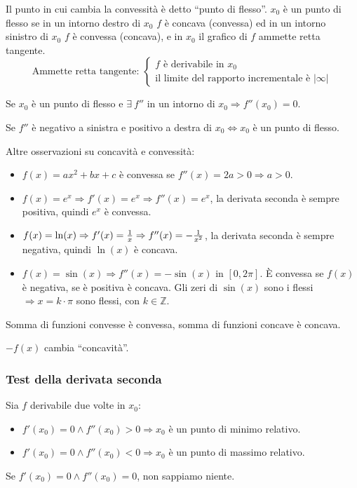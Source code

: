 \documentclass[12pt,a4paper]{article}
\begin{document}
Il punto in cui cambia la convessit\`a \`e detto ``punto di flesso''.
$x_0$ \`e un punto di flesso se in un intorno destro di $x_0$ $f$ \`e
concava (convessa) ed in un intorno sinistro di $x_0$ $f$ \`e convessa
(concava), e in $x_0$ il grafico di $f$ ammette retta tangente.\footnotemark
$$
\text{Ammette retta tangente: }
\begin{cases}
f \text{ \`e derivabile in } x_0 \\
\text{il limite del rapporto incrementale \`e } |\infty|
\end{cases}
$$


Se $x_0$ \`e un punto di flesso e $\exists \ f''$ in un intorno di $x_0 
\Rightarrow f''(x_0) = 0$.

Se $f''$ \`e negativo a sinistra e positivo a destra di $x_0 \Leftrightarrow
x_0$ \`e un punto di flesso.

Altre osservazioni su concavit\`a e convessit\`a:
\begin{itemize}
\item   $f(x) = ax^2 + bx + c$ \`e convessa se $f''(x) = 2a > 0 
        \Rightarrow a > 0$.
\item   $f(x) = e^x \Rightarrow f'(x) = e^x \Rightarrow f''(x) = e^x$, la
        derivata seconda \`e sempre positiva, quindi $e^x$ \`e convessa.
\item   $f(x) = \ln(x) \Rightarrow f'(x) = {1 \over x} \Rightarrow f''(x) =
        - {1 \over x^2}$, la derivata seconda \`e sempre negativa, quindi
        $\ln(x)$ \`e concava.
\item   $f(x) = \sin(x) \Rightarrow f''(x) = - \sin(x)$ in $[0,2\pi]$.
        \`E convessa se $f(x)$ \`e negativa, se \`e positiva \`e concava.
        Gli zeri di $\sin(x)$ sono i flessi $\Rightarrow x = k \cdot \pi $
        sono flessi, con $k \in \mathbb{Z}$.
\end{itemize}

Somma di funzioni convesse \`e convessa, somma di funzioni concave \`e concava.

$-f(x)$ cambia ``concavit\`a''.

\subsubsection{Test della derivata seconda}
Sia $f$ derivabile due volte in $x_0$:
\begin{itemize}
\item   $f'(x_0) = 0 \land f''(x_0) > 0 \Rightarrow x_0$ \`e un punto di minimo
        relativo.
\item   $f'(x_0) = 0 \land f''(x_0) < 0 \Rightarrow x_0$ \`e un punto di 
        massimo relativo.
\end{itemize}
Se $f'(x_0) = 0 \land f''(x_0) = 0$, non sappiamo niente.
\end{document}
